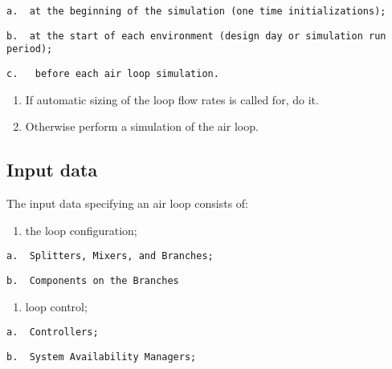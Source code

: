 \begin{lstlisting}
a.  at the beginning of the simulation (one time initializations);
\end{lstlisting}

\begin{lstlisting}
b.  at the start of each environment (design day or simulation run period);
\end{lstlisting}

\begin{lstlisting}
c.   before each air loop simulation.
\end{lstlisting}

\begin{enumerate}
\def\labelenumi{\arabic{enumi}.}
\setcounter{enumi}{2}
\item
  If automatic sizing of the loop flow rates is called for, do it.
\item
  Otherwise perform a simulation of the air loop.
\end{enumerate}

\subsection{Input data}\label{input-data}

The input data specifying an air loop consists of:

\begin{enumerate}
\def\labelenumi{\arabic{enumi}.}
\tightlist
\item
  the loop configuration;
\end{enumerate}

\begin{lstlisting}
a.  Splitters, Mixers, and Branches;
\end{lstlisting}

\begin{lstlisting}
b.  Components on the Branches
\end{lstlisting}

\begin{enumerate}
\def\labelenumi{\arabic{enumi}.}
\setcounter{enumi}{1}
\tightlist
\item
  loop control;
\end{enumerate}

\begin{lstlisting}
a.  Controllers;
\end{lstlisting}

\begin{lstlisting}
b.  System Availability Managers;
\end{lstlisting}

